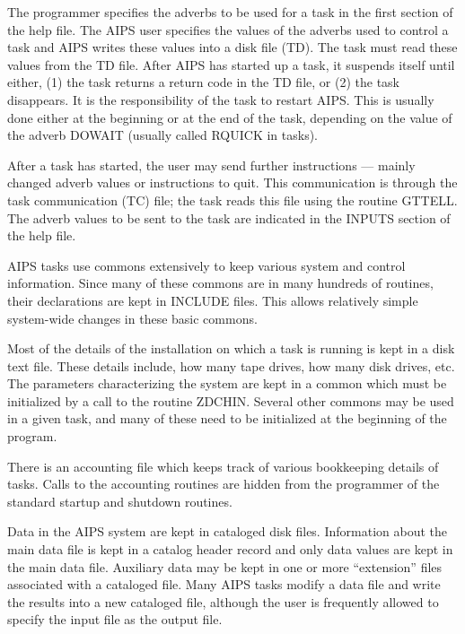 The programmer specifies the adverbs to be used for a task in the
first section of the help file. The AIPS user specifies the values of
the adverbs used to control a task and AIPS writes these values into a
disk file (TD).  The task must read these values from the TD file.
After AIPS has started up a task, it suspends itself until either, (1)
the task returns a return code in the TD file, or (2) the task
disappears. It is the responsibility of the task to restart AIPS. This
is usually done either at the beginning or at the end of the task,
depending on the value of the adverb DOWAIT (usually called RQUICK in
tasks).

After a task has started, the user may send further instructions ---
mainly changed adverb values or instructions to quit.  This
communication is through the task communication (TC) file; the task
reads this file using the routine GTTELL.  The adverb values to be
sent to the task are indicated in the INPUTS section of the help file.

AIPS tasks use commons extensively to keep various system and control
information.  Since many of these commons are in many hundreds of
routines, their declarations are kept in INCLUDE files. This allows
relatively simple system-wide changes in these basic commons.

Most of the details of the installation on which a task is running is
kept in a disk text file.  These details include, how many tape
drives, how many disk drives, etc.  The parameters characterizing the
system are kept in a common which must be initialized by a call to the
routine ZDCHIN.  Several other commons may be used in a given task,
and many of these need to be initialized at the beginning of the
program.

There is an accounting file which keeps track of various bookkeeping
details of tasks.  Calls to the accounting routines are hidden from
the programmer of the standard startup and shutdown routines.

Data in the AIPS system are kept in cataloged disk files. Information
about the main data file is kept in a catalog header record and only
data values are kept in the main data file. Auxiliary data may be kept
in one or more ``extension'' files associated with a cataloged file.
Many AIPS tasks modify a data file and write the results into a new
cataloged file, although the user is frequently allowed to specify the
input file as the output file.

